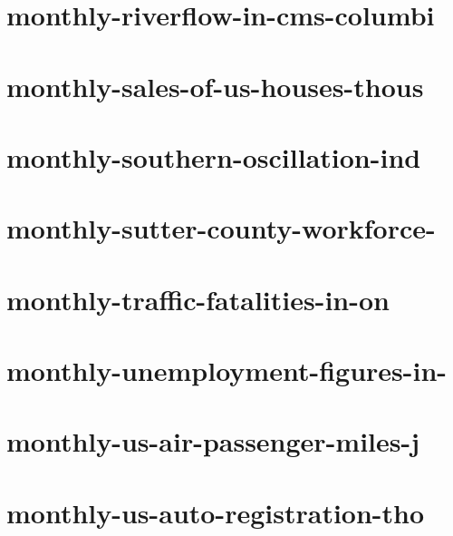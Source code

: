 \documentclass[twoside]{article}
\begin{document}
    

\section{monthly-riverflow-in-cms-columbi}

    

\section{monthly-sales-of-us-houses-thous}

    

\section{monthly-southern-oscillation-ind}

    

\section{monthly-sutter-county-workforce-}

    

\section{monthly-traffic-fatalities-in-on}

    

\section{monthly-unemployment-figures-in-}

    

\section{monthly-us-air-passenger-miles-j}

    

\section{monthly-us-auto-registration-tho}
\end{document}
